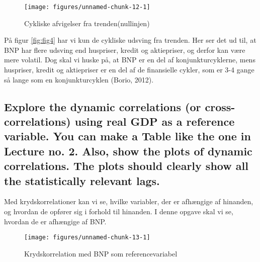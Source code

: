 \documentclass[
  10pt,
]{article}
\begin{document}
\begin{figure}[H]

{\centering \texttt{[image: figures/unnamed-chunk-12-1]} 

}

\caption{\label{fig:fig4}Cykliske afvigelser fra trenden(nullinjen)}\label{fig:unnamed-chunk-12}
\end{figure}

På figur \ref{fig:fig4} har vi kun de cykliske udsving fra trenden. Her
ser det ud til, at BNP har flere udsving end huspriser, kredit og
aktiepriser, og derfor kan være mere volatil. Dog skal vi huske på, at
BNP er en del af konjunkturcyklerne, mens huspriser, kredit og
aktiepriser er en del af de finansielle cykler, som er 3-4 gange så
lange som en konjunkturcyklen (Borio, 2012).

\newpage

\hypertarget{explore-the-dynamic-correlations-or-cross-correlations-using-real-gdp-as-a-reference-variable.-you-can-make-a-table-like-the-one-in-lecture-no.-2.-also-show-the-plots-of-dynamic-correlations.-the-plots-should-clearly-show-all-the-statistically-relevant-lags.}{%
\subsection{Explore the dynamic correlations (or cross-correlations)
using real GDP as a reference variable. You can make a Table like the
one in Lecture no. 2. Also, show the plots of dynamic correlations. The
plots should clearly show all the statistically relevant
lags.}\label{explore-the-dynamic-correlations-or-cross-correlations-using-real-gdp-as-a-reference-variable.-you-can-make-a-table-like-the-one-in-lecture-no.-2.-also-show-the-plots-of-dynamic-correlations.-the-plots-should-clearly-show-all-the-statistically-relevant-lags.}}

Med krydskorrelationer kan vi se, hvilke variabler, der er afhængige af
hinanden, og hvordan de opfører sig i forhold til hinanden. I denne
opgave skal vi se, hvordan de er afhængige af BNP.

\begin{figure}[H]

{\centering \texttt{[image: figures/unnamed-chunk-13-1]} 

}

\caption{\label{fig:fig5}Krydskorrelation med BNP som referencevariabel}\label{fig:unnamed-chunk-13}
\end{figure}
\end{document}

